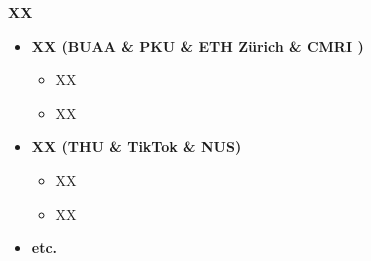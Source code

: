\begin{frame}
\begin{columns}[T]
\begin{block}{\textbf{XX}}
\begin{itemize}
                \item \textbf{XX (BUAA \& PKU \& ETH Zürich \& CMRI )}
                    \begin{itemize}
                            \footnotesize
                            \setlength{
                            \itemindent}{-1em}
                        \item XX
                        \item XX
                    \end{itemize}

                \item \textbf{XX (THU \& TikTok \& NUS)}
                    \begin{itemize}
                            \footnotesize
                        \item XX
                        \item XX
                    \end{itemize}
                \item \textbf{etc.}
            \end{itemize}
        \end{block}
    \end{columns}
\end{frame}
